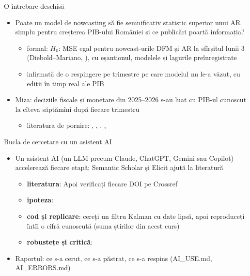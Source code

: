 \begin{frame}{O întrebare deschisă}
\itemsize{\small}
\begin{itemize}
    \item Poate un model de nowcasting să fie semnificativ statistic superior unui AR simplu pentru creșterea PIB-ului României și ce publicări poartă informația?
    \begin{itemize}
        \item formal: $H_0$: MSE egal pentru nowcast-urile DFM și AR la sfîrșitul lunii 3 (Diebold--Mariano, ), cu eșantionul, modelele și lagurile preînregistrate
        \item infirmată de o respingere pe trimestre pe care modelul nu le-a văzut, cu ediții în timp real ale PIB
    \end{itemize}
    \item Miza: deciziile fiscale și monetare din 2025--2026 s-au luat cu PIB-ul cunoscut la cîteva săptămîni după fiecare trimestru
    \begin{itemize}
        \item literatura de pornire: , , , , 
    \end{itemize}
\end{itemize}
\end{frame}

\begin{frame}{Bucla de cercetare cu un asistent AI}
\itemsize{\footnotesize}
\begin{itemize}
    \item Un asistent AI (un LLM precum Claude, ChatGPT, Gemini sau Copilot) accelerează fiecare etapă; Semantic Scholar și Elicit ajută la literatură
    \begin{itemize}
        \item \textbf{literatura}:  Apoi verificați fiecare DOI pe Crossref
        \item \textbf{ipoteza}: 
        \item \textbf{cod și replicare}: cereți un filtru Kalman cu date lipsă, apoi reproduceți întîi o cifră cunoscută (suma știrilor din acest curs)
        \item \textbf{robustețe și critică}: 
    \end{itemize}
    \item Raportul: ce s-a cerut, ce s-a păstrat, ce s-a respins (AI\_USE.md, AI\_ERRORS.md)
\end{itemize}
\end{frame}

